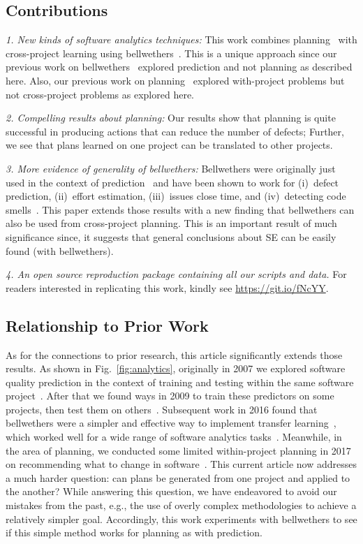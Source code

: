 \documentclass[10pt, journal, compsoc]{IEEEtran}
\newcommand{\fig}[1]{Fig.~\ref{fig:#1}}
\begin{document}
\subsection{Contributions}
\label{sect:contrib}
\textit{1. New kinds of software analytics techniques:} This work combines planning~\cite{krishna17a} with cross-project learning using bellwethers~\cite{krishna16}. This is a unique approach since our previous work on bellwethers~\cite{krishna16, krishna17b} explored prediction and not planning as described here. Also, our previous work on planning~\cite{krishna17a} explored with-project problems but not cross-project problems as explored here. 

\textit{2. Compelling results about planning:} Our results show that planning is quite successful in producing actions that can reduce the number of defects; Further, we see that plans learned on one project can be translated to other projects.

\textit{3. More evidence of generality of bellwethers:}  Bellwethers were
originally just used in the context of prediction~\cite{krishna16} and have been shown to work for (i)~defect prediction, (ii)~effort estimation, (iii)~issues close time, and (iv)~detecting code smells~\cite{krishna17b}. This paper extends those results with a new finding that bellwethers can also be used from cross-project planning. This is an important result of much significance since, it suggests that general conclusions about SE can be easily found (with bellwethers).

\textit{4. An open source reproduction package containing all our scripts and data.} For readers interested in replicating this work, kindly see \url{https://git.io/fNcYY}.
 
 



\subsection{Relationship to Prior Work}
\label{sect:our_prior}
As for the connections to prior research, this article significantly extends those results.
As shown in \fig{analytics}, originally in 2007 we explored software quality prediction in the context of training and testing within the same software project~\cite{menzies07}. After that we found ways in 2009 to train these predictors on some projects, then test them on others~\cite{turhan09}. Subsequent work in 2016 found that bellwethers were a simpler and effective way to implement transfer learning~\cite{krishna16}, which worked well for a wide range of software analytics tasks~\cite{krishna17b}. Meanwhile, in the area of planning, we conducted some limited within-project planning in 2017 on recommending what to change in software~\cite{krishna17a}. This current article now addresses a much harder question: can plans be generated from one project and applied to the another? While answering this question, we have endeavored to avoid our mistakes from the past, e.g., the use of overly complex methodologies to achieve a relatively simpler goal. Accordingly, this work experiments with bellwethers to see if this simple method works for planning as with prediction. 
\end{document}
